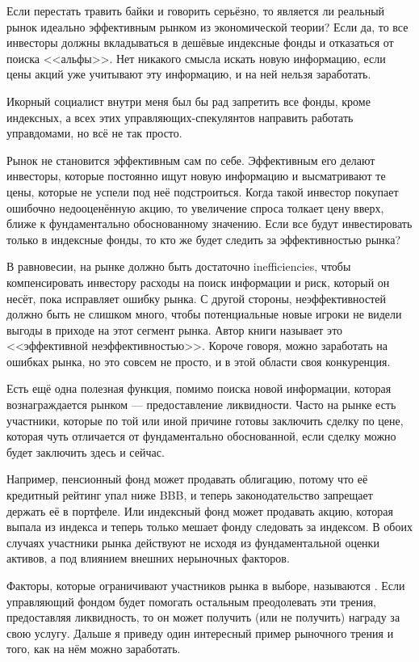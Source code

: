 Если перестать травить байки и говорить серьёзно, то является ли реальный рынок 
идеально эффективным рынком из экономической теории? Если да, то все инвесторы 
должны вкладываться в дешёвые индексные фонды и отказаться от поиска <<альфы>>. 
Нет никакого смысла искать новую информацию, если цены акций уже учитывают эту 
информацию, и на ней нельзя заработать. 

Икорный социалист внутри меня был бы рад запретить все фонды, кроме индексных, 
а всех этих управляющих-спекулянтов направить работать управдомами, но всё не 
так просто.

Рынок не становится эффективным сам по себе. Эффективным его делают 
инвесторы, которые постоянно ищут новую информацию и высматривают те цены, 
которые не успели под неё подстроиться. Когда такой инвестор покупает ошибочно 
недооценённую акцию, то увеличение спроса толкает цену вверх, ближе к 
фундаментально обоснованному значению. Если все будут инвестировать только в 
индексные фонды, то кто же будет следить за эффективностью рынка?

В равновесии, на рынке должно быть достаточно 
{inefficiencies}, чтобы компенсировать инвестору расходы на поиск информации и 
риск, который он несёт, пока исправляет ошибку рынка. С другой стороны, 
неэффективностей должно быть не слишком много, чтобы потенциальные новые игроки 
не видели выгоды в приходе на этот сегмент рынка. Автор книги
\cite{pedersen2015efficiently} называет это <<эффективной неэффективностью>>. 
Короче говоря, можно заработать на ошибках рынка, но это совсем не просто, и в 
этой области своя конкуренция.

Есть ещё одна полезная функция, помимо поиска новой информации, которая 
вознаграждается рынком --- предоставление ликвидности. Часто на рынке есть 
участники, которые по той или иной причине готовы заключить сделку по цене, 
которая чуть отличается от фундаментально обоснованной, если сделку можно будет 
заключить здесь и сейчас.

Например, пенсионный фонд может продавать облигацию, потому что её кредитный 
рейтинг упал ниже BBB, и теперь законодательство запрещает держать её в 
портфеле. Или индексный фонд может продавать акцию, которая выпала из индекса и 
теперь только мешает фонду следовать за индексом. В обоих случаях участники 
рынка действуют не исходя из фундаментальной оценки активов, а под влиянием 
внешних нерыночных факторов.

Факторы, которые ограничивают участников рынка в выборе, называются 
. Если управляющий фондом будет 
помогать остальным преодолевать эти трения, предоставляя ликвидность, то он
может получить (или не получить) награду за свою услугу. Дальше я приведу 
один интересный пример рыночного трения и того, как на нём можно заработать.


